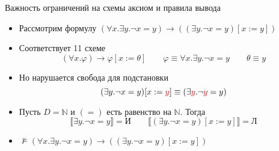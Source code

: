 \documentclass[aspectratio=169]{beamer}
\begin{document}
\begin{frame}{Важность ограничений на схемы аксиом и правила вывода}

\begin{itemize}
\item Рассмотрим формулу $(\forall x.\exists y.\neg x = y) \rightarrow ((\exists y.\neg x = y)[x := y])$\pause
\item Соответствует 11 схеме $$(\forall x.\varphi) \rightarrow \varphi[x:=\theta]\quad\quad\varphi \equiv \forall x.\exists y.\neg x = y\quad\quad
\theta \equiv y$$\pause\vspace{-0.2cm}
\item Но нарушается свобода для подстановки 
$$(\exists y.\neg x = y)[x := {\color{red}y}] \equiv (\exists {\color{red}y}.\neg {\color{red}y} = y)$$\pause\vspace{-0.2cm}
\item Пусть $D = \mathbb{N}$ и $(=)$ есть равенство на $\mathbb{N}$. Тогда 
$$\llbracket\exists y.\neg x = y\rrbracket=\text{И}\quad\quad\llbracket(\exists y.\neg x = y) [x := y]\rrbracket = \text{Л}$$\pause\vspace{-0.2cm}
\item $\not\models (\forall x.\exists y.\neg x = y) \rightarrow ((\exists y.\neg x = y)[x := y])$
\end{itemize}
\end{frame}
\end{document}
